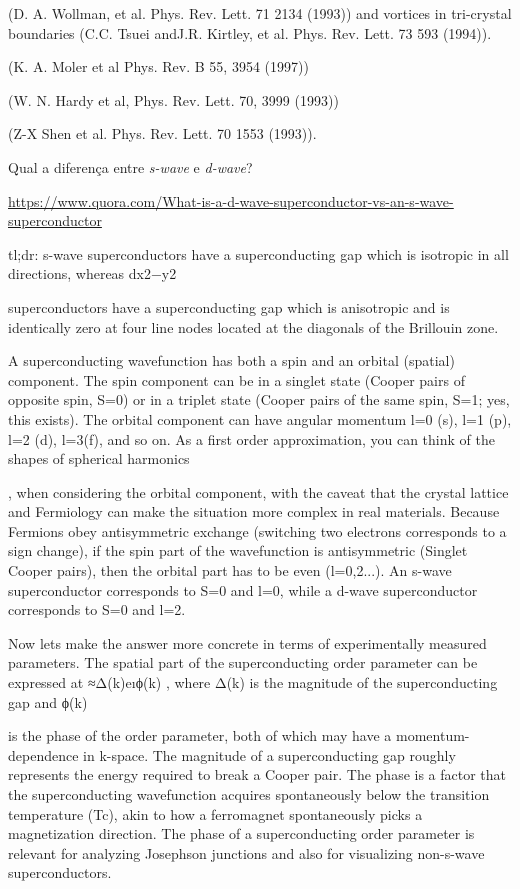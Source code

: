 \documentclass[a4paper,10pt]{article}
\begin{document}
(D. A. Wollman, et al. Phys. Rev. Lett. 71 2134 (1993)) and vortices in tri-crystal boundaries (C.C. Tsuei andJ.R. Kirtley, et al. Phys. Rev. Lett. 73 593 (1994)).

(K. A. Moler et al Phys. Rev. B 55, 3954 (1997))

(W. N. Hardy et al, Phys. Rev. Lett. 70, 3999 (1993))

(Z-X Shen et al. Phys. Rev. Lett. 70 1553 (1993)).

\n

Qual a diferença entre \textit{s-wave} e \textit{d-wave}?

\url{https://www.quora.com/What-is-a-d-wave-superconductor-vs-an-s-wave-superconductor}

tl;dr: s-wave superconductors have a superconducting gap which is isotropic in all directions, whereas dx2−y2

superconductors have a superconducting gap which is anisotropic and is identically zero at four line nodes located at the diagonals of the Brillouin zone.

A superconducting wavefunction has both a spin and an orbital (spatial) component. The spin component can be in a singlet state
(Cooper pairs of opposite spin, S=0) or in a triplet state
(Cooper pairs of the same spin, S=1; yes, this exists). The orbital component can have angular momentum l=0 (s), l=1 (p), l=2 (d), l=3(f), and so on. As a first order approximation, you can think of the shapes of spherical harmonics

, when considering the orbital component, with the caveat that the crystal lattice and Fermiology can make the situation more complex in real materials. Because Fermions obey antisymmetric exchange (switching two electrons corresponds to a sign change), if the spin part of the wavefunction is antisymmetric (Singlet Cooper pairs), then the orbital part has to be even (l=0,2...). An s-wave superconductor corresponds to S=0 and l=0, while a d-wave superconductor corresponds to S=0 and l=2.

Now lets make the answer more concrete in terms of experimentally measured parameters. The spatial part of the superconducting order parameter can be expressed at ≈Δ(k)eıϕ(k)
, where Δ(k) is the magnitude of the superconducting gap and ϕ(k)

is the phase of the order parameter, both of which may have a momentum-dependence in k-space. The magnitude of a superconducting gap roughly represents the energy required to break a Cooper pair. The phase is a factor that the superconducting wavefunction acquires spontaneously below the transition temperature (Tc), akin to how a ferromagnet spontaneously picks a magnetization direction. The phase of a superconducting order parameter is relevant for analyzing Josephson junctions and also for visualizing non-s-wave superconductors.
\end{document}
